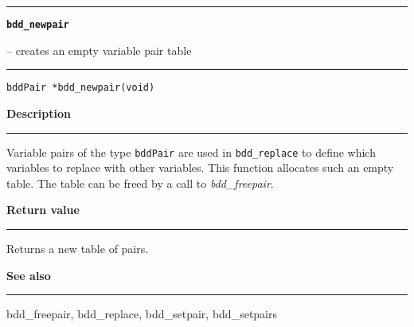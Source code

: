 \begin{minipage}{\textwidth}

\noindent\begin{minipage}{\textwidth}
\rule{\textwidth}{0.5mm}
{\tt\bf bdd\_newpair }
\--- creates an empty variable pair table  \hspace{\fill}
\\\rule[1.5ex]{\textwidth}{0.5mm}
\end{minipage}

\noindent\begin{verbatim}
bddPair *bdd_newpair(void) 
\end{verbatim}

\vspace{\parsep}\noindent
{\bf Description}\\\rule[1.5ex]{\textwidth}{0.2mm}\vspace{-1.5ex}\setlength{\parindent}{1em}
Variable pairs of the type {\tt bddPair} are used in
           {\tt bdd\_replace} to define which variables to replace with
	   other variables. This function allocates such an empty table. The
	   table can be freed by a call to {\em bdd\_freepair}. 

\setlength{\parindent}{0em}\vspace{\parsep}\vspace{\baselineskip}\noindent
{\bf Return value}\\\rule[1.5ex]{\textwidth}{0.2mm}\vspace{-1.5ex}
Returns a new table of pairs. 

\vspace{\parsep}\vspace{\baselineskip}\noindent
{\bf See also}\\\rule[1.5ex]{\textwidth}{0.2mm}\vspace{-1.5ex}
bdd\_freepair, bdd\_replace, bdd\_setpair, bdd\_setpairs 
\end{minipage}
\vspace{8ex}
